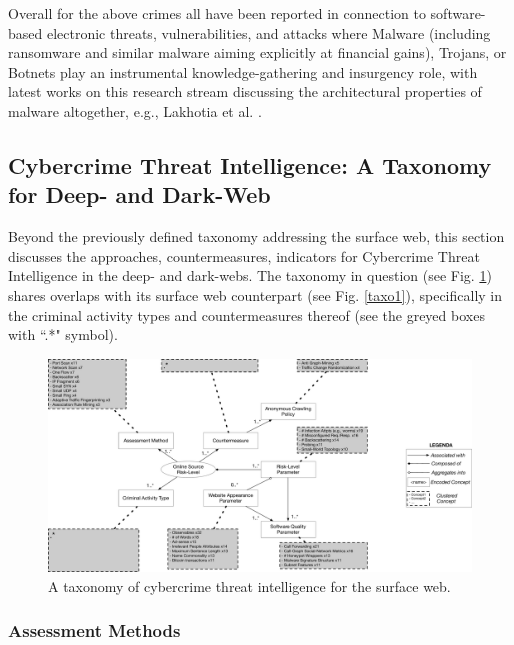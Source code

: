 Overall for the above crimes all have been reported in connection to software-based electronic threats, vulnerabilities, and attacks where Malware (including ransomware and similar malware aiming explicitly at financial gains), Trojans, or Botnets play an instrumental knowledge-gathering and insurgency role, with latest works on this research stream discussing the architectural properties of malware altogether, e.g., Lakhotia et al. \cite{LakhotiaB17}.


\subsection{Cybercrime Threat Intelligence: A Taxonomy for Deep- and Dark-Web}

Beyond the previously defined taxonomy addressing the surface web, this section discusses the approaches, countermeasures, indicators for Cybercrime Threat Intelligence in the deep- and dark-webs. The taxonomy in question (see Fig. \ref{taxo2}) shares overlaps with its surface web counterpart (see Fig. \ref{taxo1}), specifically in the criminal activity types and countermeasures thereof (see the greyed boxes with ``.*" symbol).

\begin{figure}
\begin{center}
\includegraphics[scale=0.3]{./img/taxo2.pdf}
\end{center}
\caption{A taxonomy of cybercrime threat intelligence for the surface web.}\label{taxo2}
\end{figure}

\subsubsection{Assessment Methods}


